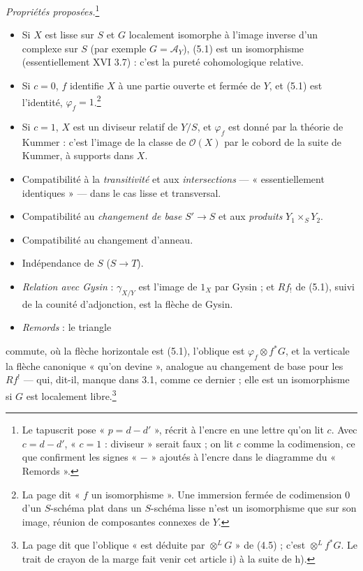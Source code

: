 \documentclass[11pt,a4paper]{article}
\begin{document}
\emph{Propriétés proposées.}\footnote{Le tapuscrit pose « $p = d - d'$ »,
récrit à l'encre en une lettre qu'on lit $c$. Avec $c = d - d'$, « $c = 1$ :
diviseur » serait faux ; on lit $c$ comme la codimension, ce que confirment les
signes « $-$ » ajoutés à l'encre dans le diagramme du « Remords ».}
\begin{itemize}
\item[a)] Si $X$ est lisse sur $S$ et $G$ localement isomorphe à l'image
inverse d'un complexe sur $S$ (par exemple $G = \mathcal{A}_Y$), (5.1) est un
isomorphisme (essentiellement XVI 3.7) : c'est la pureté cohomologique
relative.
\item[b)] Si $c = 0$, $f$ identifie $X$ à une partie ouverte et fermée de $Y$,
et (5.1) est l'identité, $\varphi_f = 1$.\footnote{La page dit « $f$ un
isomorphisme ». Une immersion fermée de codimension $0$ d'un $S$-schéma plat
dans un $S$-schéma lisse n'est un isomorphisme que sur son image, réunion de
composantes connexes de $Y$.}
\item[c)] Si $c = 1$, $X$ est un diviseur relatif de $Y/S$, et $\varphi_f$ est
donné par la théorie de Kummer : c'est l'image de la classe de $\mathcal{O}(X)$
par le cobord de la suite de Kummer, à supports dans $X$.
\item[d)] Compatibilité à la \emph{transitivité} et aux \emph{intersections}
--- « essentiellement identiques » --- dans le cas lisse et transversal.
\item[e)] Compatibilité au \emph{changement de base} $S' \to S$ et aux
\emph{produits} $Y_1 \times_S Y_2$.
\item[f)] Compatibilité au changement d'anneau.
\item[g)] Indépendance de $S$ ($S \to T$).
\item[h)] \emph{Relation avec Gysin} : $\gamma_{X/Y}$ est l'image de $1_X$ par
Gysin ; et $Rf_!$ de (5.1), suivi de la counité d'adjonction, est la flèche de
Gysin.
\item[i)] \emph{Remords} : le triangle
\end{itemize}


commute, où la flèche horizontale est (5.1), l'oblique est $\varphi_f \otimes
f^*G$, et la verticale la flèche canonique « qu'on devine », analogue au
changement de base pour les $Rf^!$ --- qui, dit-il, manque dans 3.1, comme ce
dernier ; elle est un isomorphisme si $G$ est localement libre.\footnote{La
page dit que l'oblique « est déduite par $\otimes^L G$ » de (4.5) ; c'est
$\otimes^L f^*G$. Le trait de crayon de la marge fait venir cet article i) à
la suite de h).}
\end{document}
